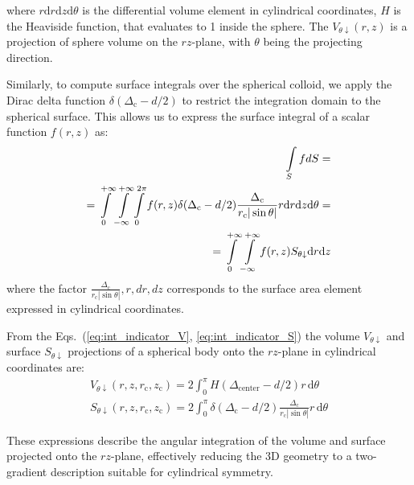 \documentclass[10pt, a4paper]{article}
\begin{document}
\begin{multicols}{2}
where $ r \text{d}r \text{d}z \text{d}\theta$ is the differential volume element in cylindrical coordinates, $H$ is the Heaviside function, that evaluates to 1 inside the sphere.
The $V_{\theta \downarrow}(r,z)$ is a projection of sphere volume on the $rz$-plane, with $\theta$ being the projecting direction.

Similarly, to compute surface integrals over the spherical colloid, we apply the Dirac delta function $\delta(\Delta_{\text{c}} - d/2)$ to restrict the integration domain to the spherical surface.
This allows us to express the surface integral of a scalar function $f(r,z)$ as:
\begin{eqnarray}
    \label{eq:int_indicator_S}
    \begin{aligned}
        \int\limits_{S} f dS = \\
        = \int\displaylimits_{0}^{+\infty} \int\displaylimits_{-\infty}^{+\infty} \int\displaylimits_{0}^{2\pi} f(r, z) \delta(\Delta_{\text{c}} - d/2)  \frac{\Delta_{\text{c}}}{r_{\text{c}} |\sin\theta|} r \text{d}r \text{d}z \text{d}\theta=\\
        =\int\displaylimits_{0}^{+\infty} \int\displaylimits_{-\infty}^{+\infty} f(r, z)  S_{\theta \downarrow} \text{d}r \text{d}z
    \end{aligned}
\end{eqnarray}
where the factor $\frac{\Delta_{\text{c}}}{r_{\text{c}} |\sin\theta|} , r , dr , dz$ corresponds to the surface area element expressed in cylindrical coordinates.


From the Eqs.~(\ref{eq:int_indicator_V}, \ref{eq:int_indicator_S}) the volume $V_{\theta \downarrow}$ and surface $S_{\theta \downarrow}$ projections of a spherical body onto the $rz$-plane in cylindrical coordinates are:
\begin{gather}
    V_{\theta \downarrow}(r, z, r_{\text{c}}, z_{\text{c}}) = 2\int_{0}^{\pi} H\!\left( \Delta_{\text{center}} - {d}/{2} \right) r \, \text{d}\theta
    \\
    S_{\theta \downarrow}(r, z, r_{\text{c}}, z_{\text{c}}) = 2\int_{0}^{\pi}\delta(\Delta_{\text{c}} - d/2)  \frac{\Delta_{\text{c}}}{r_{\text{c}} |\sin\theta|} r \, \text{d}\theta
\end{gather}

These expressions describe the angular integration of the volume and surface projected onto the $rz$-plane, effectively reducing the 3D geometry to a two-gradient description suitable for cylindrical symmetry.


\end{multicols}
\end{document}
